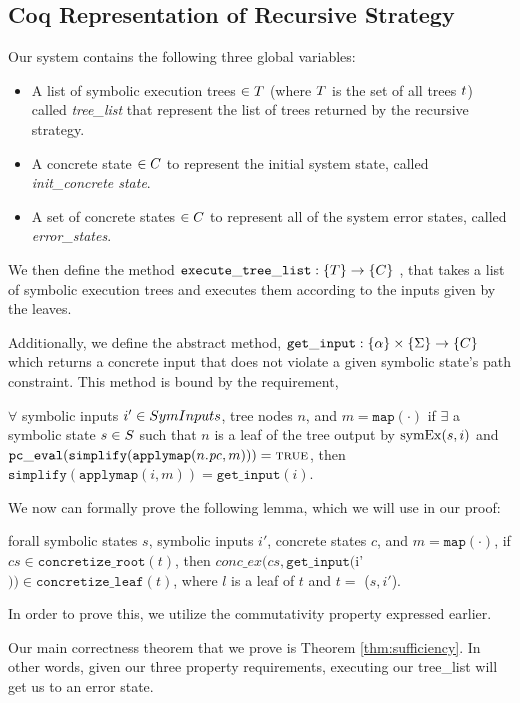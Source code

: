 \subsection{Coq Representation of Recursive Strategy}
Our system contains the following three global variables:
\begin{itemize}
\item A list of symbolic execution trees $\in T$ (where $T$ is the set of all trees $t$) called \textit{tree\_list} that represent the list of trees returned by the recursive strategy.
\item A concrete state $\in C$ to represent the initial system state, called \textit{init\_concrete state}.
\item A set of concrete states $\in C$ to represent all of the system error states, called \textit{error\_states}.
\end{itemize}

We then define the method $ \mathtt{execute\_tree\_list} : \{ T \} \rightarrow \{C\}$ , that takes a list of symbolic execution trees and executes them according to the inputs given by the leaves.

Additionally, we define the abstract method, $ \mathtt{get\_input} : \{\alpha\} \times \{\Sigma\} \rightarrow \{C\}$ which returns a concrete input that does not violate a given symbolic state's path constraint.
This method is bound by the requirement,

\begin{definition}
$ \forall$ symbolic inputs $i' \in SymInputs$, tree nodes $n$, and $m = \mathtt{map(\cdot)}$
if $\exists$ a symbolic state $s \in S$  such that
$n$ is a leaf of the tree output by $\mathrm{symEx}(s, i)$ and 
$\mathtt{pc\_eval} (\mathtt{simplify}(\mathtt{applymap} (n.\mathit{pc}, m))) = \mathtt{\textsc{true}}$, then
$\mathtt{simplify}(\mathtt{applymap} (i, m)) = \mathtt{get\_input}(i)$.
\end{definition}



We now can formally prove the following lemma, which we will use in our proof:
\begin{lemma} \label{cop}
forall symbolic states $s$, symbolic inputs $i'$, concrete states $c$, and $m = \mathtt{map(\cdot)}$,
if $cs \in \mathtt{concretize\_root}(t)$,
then 
$conc\_ex(cs, \mathtt{get\_input} ($i'$)) \in \mathtt{concretize\_leaf}(t)$,
where $l$ is a leaf of $t$ and $t = $ \symexecution($s, i'$).
\end{lemma}

In order to prove this, we utilize the commutativity property expressed earlier.





Our main correctness theorem that we prove is Theorem \ref{thm:sufficiency}. In other words, given our three property requirements, executing our tree\_list will get us to an error state.
